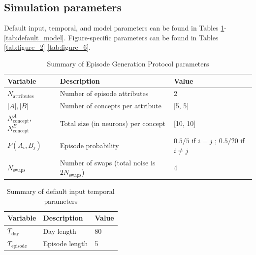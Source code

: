 \documentclass{article}
\begin{document}
\subsection*{Simulation parameters}
Default input, temporal, and model parameters can be found in Tables \ref{tab:default_input}-\ref{tab:default_model}. Figure-specific parameters can be found in Tables \ref{tab:figure_2}-\ref{tab:figure_6}.
\begin{table}[ht]
\centering
\caption{Summary of Episode Generation Protocol parameters}
\label{tab:default_input}
\begin{tabular}{lll}
\toprule
\textbf{Variable} & \textbf{Description} & \textbf{Value} \\
\midrule
$N_\textrm{attributes}$ & Number of episode attributes & 2 \\
$|A|, |B| $ & Number of concepts per attribute & [5, 5] \\
$N_\textrm{concept}^A$, $N_\textrm{concept}^B$ & Total size (in neurons) per concept & [10, 10] \\
$P(A_i, B_j)$ & Episode probability & $0.5/5$ if $i = j$ ; $0.5/20$ if $i\neq j$ \\
$N_\textrm{swaps}$ & Number of swaps (total noise is $2N_\textrm{swaps}$) & 4 \\
\bottomrule
\end{tabular}
\end{table}
\begin{table}[ht]
\centering
\caption{Summary of default input temporal parameters}
\label{tab:default_time}
\begin{tabular}{lll}
\toprule
\textbf{Variable} & \textbf{Description} & \textbf{Value} \\
\midrule
$T_\textrm{day}$ & Day length & 80 \\
$T_\textrm{episode}$ & Episode length & 5 \\
\bottomrule
\end{tabular}
\end{table}
\end{document}
